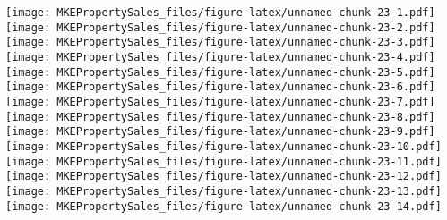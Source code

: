 \documentclass[
]{article}
\newenvironment{Shaded}{\begin{snugshade}}{\end{snugshade}}
\newcommand{\AttributeTok}[1]{\textcolor[rgb]{0.77,0.63,0.00}{#1}}
\newcommand{\CommentTok}[1]{\textcolor[rgb]{0.56,0.35,0.01}{\textit{#1}}}
\newcommand{\DecValTok}[1]{\textcolor[rgb]{0.00,0.00,0.81}{#1}}
\newcommand{\FunctionTok}[1]{\textcolor[rgb]{0.00,0.00,0.00}{#1}}
\newcommand{\NormalTok}[1]{#1}
\newcommand{\OtherTok}[1]{\textcolor[rgb]{0.56,0.35,0.01}{#1}}
\newcommand{\SpecialCharTok}[1]{\textcolor[rgb]{0.00,0.00,0.00}{#1}}
\begin{document}
\begin{Shaded}
\end{Shaded}

\texttt{[image: MKEPropertySales\_files/figure-latex/unnamed-chunk-23-1.pdf]}
\texttt{[image: MKEPropertySales\_files/figure-latex/unnamed-chunk-23-2.pdf]}
\texttt{[image: MKEPropertySales\_files/figure-latex/unnamed-chunk-23-3.pdf]}
\texttt{[image: MKEPropertySales\_files/figure-latex/unnamed-chunk-23-4.pdf]}
\texttt{[image: MKEPropertySales\_files/figure-latex/unnamed-chunk-23-5.pdf]}
\texttt{[image: MKEPropertySales\_files/figure-latex/unnamed-chunk-23-6.pdf]}
\texttt{[image: MKEPropertySales\_files/figure-latex/unnamed-chunk-23-7.pdf]}
\texttt{[image: MKEPropertySales\_files/figure-latex/unnamed-chunk-23-8.pdf]}
\texttt{[image: MKEPropertySales\_files/figure-latex/unnamed-chunk-23-9.pdf]}
\texttt{[image: MKEPropertySales\_files/figure-latex/unnamed-chunk-23-10.pdf]}
\texttt{[image: MKEPropertySales\_files/figure-latex/unnamed-chunk-23-11.pdf]}
\texttt{[image: MKEPropertySales\_files/figure-latex/unnamed-chunk-23-12.pdf]}
\texttt{[image: MKEPropertySales\_files/figure-latex/unnamed-chunk-23-13.pdf]}
\texttt{[image: MKEPropertySales\_files/figure-latex/unnamed-chunk-23-14.pdf]}
\end{document}
